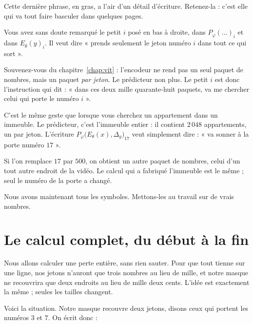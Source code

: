 Cette dernière phrase, en gras, a l'air d'un détail d'écriture. Retenez-la :
c'est elle qui va tout faire basculer dans quelques pages.

\begin{notation}
Vous avez sans doute remarqué le petit $i$ posé en bas à droite, dans
$P_{\varphi}(\ldots)_i$ et dans $E_{\bar{\theta}}(y)_i$. Il veut dire
« prends seulement le jeton numéro $i$ dans tout ce qui sort ».

Souvenez-vous du chapitre~\ref{chap:vit} : l'encodeur ne rend pas un seul
paquet de nombres, mais un paquet \emph{par jeton}. Le prédicteur non plus.
Le petit $i$ est donc l'instruction qui dit : « dans ces deux mille
quarante-huit paquets, va me chercher celui qui porte le numéro $i$ ».
\end{notation}

\begin{exemple}
C'est le même geste que lorsque vous cherchez un appartement dans un
immeuble. Le prédicteur, c'est l'immeuble entier : il contient $2\,048$
appartements, un par jeton. L'écriture
$P_{\varphi}\bigl(E_{\theta}(x), \Delta_y\bigr)_{17}$ veut simplement dire :
« va sonner à la porte numéro $17$ ».

Si l'on remplace $17$ par $500$, on obtient un autre paquet de nombres,
celui d'un tout autre endroit de la vidéo. Le calcul qui a fabriqué
l'immeuble est le même ; seul le numéro de la porte a changé.
\end{exemple}

Nous avons maintenant tous les symboles. Mettons-les au travail sur de vrais
nombres.

\section{Le calcul complet, du début à la fin}
\label{sec:calcul-complet}

\begin{enclair}
Nous allons calculer une perte entière, sans rien sauter. Pour que tout
tienne sur une ligne, nos jetons n'auront que trois nombres au lieu de mille,
et notre masque ne recouvrira que deux endroits au lieu de mille deux cents.
L'idée est exactement la même ; seules les tailles changent.
\end{enclair}

Voici la situation. Notre masque recouvre deux jetons, disons ceux qui
portent les numéros $3$ et $7$. On écrit donc :

